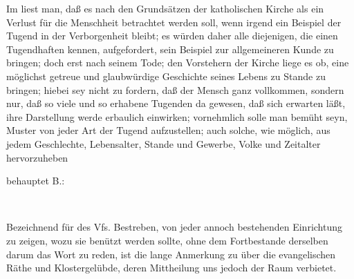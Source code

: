 Im  liest man, daß es nach den Grundsätzen der katholischen Kirche als ein Verlust für die Menschheit betrachtet werden soll, wenn irgend ein Beispiel der Tugend in der Verborgenheit bleibt; es würden daher alle diejenigen, die einen Tugendhaften kennen, aufgefordert, sein Beispiel zur allgemeineren Kunde zu bringen;  doch erst nach seinem Tode; den Vorstehern der Kirche liege es ob, eine möglichst getreue und glaubwürdige Geschichte seines Lebens zu Stande zu bringen; hiebei sey nicht zu fordern, daß der Mensch ganz vollkommen, sondern nur, daß so viele und so erhabene Tugenden da gewesen, daß sich erwarten läßt, ihre Darstellung werde erbaulich einwirken; vornehmlich solle man bemüht seyn, Muster von jeder Art der Tugend aufzustellen; auch solche, wie möglich, aus jedem Geschlechte, Lebensalter, Stande und Gewerbe, Volke und Zeitalter hervorzuheben \usw\ \par
{} behauptet B.:  \par
\usw\ \par
Bezeichnend für des Vfs. Bestreben, von jeder annoch bestehenden Einrichtung zu zeigen, wozu sie benützt werden sollte, ohne dem Fortbestande derselben darum das Wort zu reden, ist die lange Anmerkung zu  über die evangelischen Räthe und Klostergelübde, deren Mittheilung uns jedoch der Raum verbietet. \par
